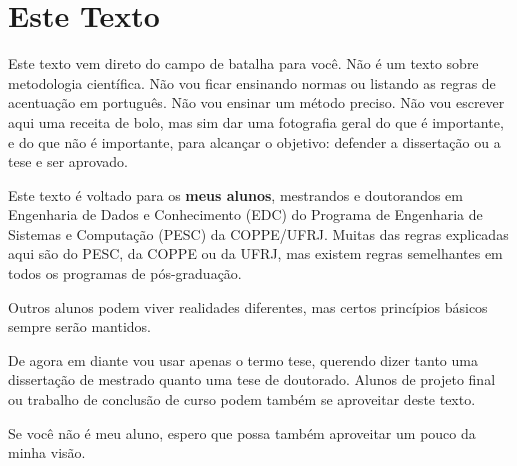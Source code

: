 \chapter{Este Texto}

Este texto vem direto do campo de batalha para você.
Não é um texto sobre metodologia científica. Não vou ficar ensinando normas ou listando as regras de acentuação em português. Não vou ensinar um método preciso. Não vou escrever aqui uma receita de bolo, mas sim dar uma fotografia geral do que é importante, e do que não é importante, para alcançar o objetivo: defender a dissertação ou a tese e ser aprovado.

Este texto é voltado para os \textbf{meus alunos}, mestrandos e doutorandos em Engenharia de Dados e Conhecimento (EDC) do Programa de Engenharia de Sistemas e Computação (PESC) da COPPE/UFRJ. Muitas das regras explicadas aqui são do PESC, da COPPE ou da UFRJ, mas existem regras semelhantes em todos os programas de pós-graduação.

Outros alunos podem viver realidades diferentes, mas certos princípios básicos sempre serão mantidos.

De agora em diante vou usar apenas o termo tese, querendo dizer tanto uma dissertação de mestrado quanto uma tese de doutorado. Alunos de projeto final ou trabalho de conclusão de curso podem também se aproveitar deste texto.

Se você não é meu aluno, espero que possa também aproveitar um pouco da minha visão. 

